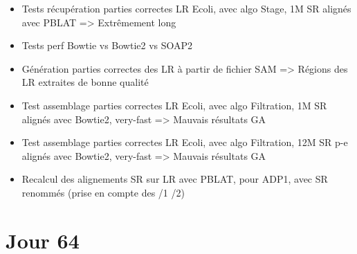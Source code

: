 \documentclass[12pt]{report}
\begin{document}
\begin{itemize}
	\item Tests récupération parties correctes LR Ecoli, avec algo Stage, 1M SR alignés avec PBLAT => Extrêmement long
	
	\item Tests perf Bowtie vs Bowtie2 vs SOAP2
	
	\item Génération parties correctes des LR à partir de fichier SAM => Régions des LR extraites de bonne qualité
	
	\item Test assemblage parties correctes LR Ecoli, avec algo Filtration, 1M SR alignés avec Bowtie2, very-fast => Mauvais résultats GA
	
	\item Test assemblage parties correctes LR Ecoli, avec algo Filtration, 12M SR p-e alignés avec Bowtie2, very-fast => Mauvais résultats GA
	
	\item Recalcul des alignements SR sur LR avec PBLAT, pour ADP1, avec SR renommés (prise en compte des /1 /2)
\end{itemize}

\section{Jour 64}
\end{document}
